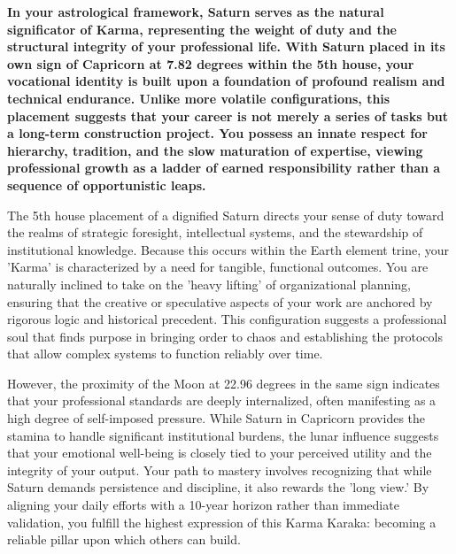 {\fontsize{9.5}{13.8}\selectfont\bfseries\color{DeepSlate} In your astrological framework, Saturn serves as the natural significator of Karma, representing the weight of duty and the structural integrity of your professional life. With Saturn placed in its own sign of Capricorn at 7.82 degrees within the 5th house, your vocational identity is built upon a foundation of profound realism and technical endurance. Unlike more volatile configurations, this placement suggests that your career is not merely a series of tasks but a long-term construction project. You possess an innate respect for hierarchy, tradition, and the slow maturation of expertise, viewing professional growth as a ladder of earned responsibility rather than a sequence of opportunistic leaps.}\par\vspace{2mm}

{\fontsize{9}{13}\selectfont The 5th house placement of a dignified Saturn directs your sense of duty toward the realms of strategic foresight, intellectual systems, and the stewardship of institutional knowledge. Because this occurs within the Earth element trine, your 'Karma' is characterized by a need for tangible, functional outcomes. You are naturally inclined to take on the 'heavy lifting' of organizational planning, ensuring that the creative or speculative aspects of your work are anchored by rigorous logic and historical precedent. This configuration suggests a professional soul that finds purpose in bringing order to chaos and establishing the protocols that allow complex systems to function reliably over time.}\par\vspace{1.8mm}

{\fontsize{9}{13}\selectfont However, the proximity of the Moon at 22.96 degrees in the same sign indicates that your professional standards are deeply internalized, often manifesting as a high degree of self-imposed pressure. While Saturn in Capricorn provides the stamina to handle significant institutional burdens, the lunar influence suggests that your emotional well-being is closely tied to your perceived utility and the integrity of your output. Your path to mastery involves recognizing that while Saturn demands persistence and discipline, it also rewards the 'long view.' By aligning your daily efforts with a 10-year horizon rather than immediate validation, you fulfill the highest expression of this Karma Karaka: becoming a reliable pillar upon which others can build.}\par\vspace{1.8mm}

